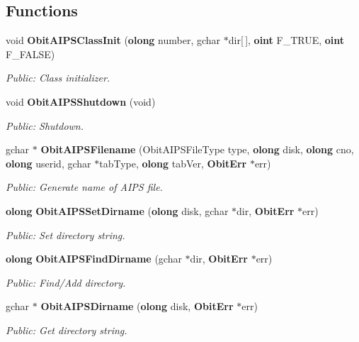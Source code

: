 \subsection*{Functions}
\begin{CompactItemize}
\item 
void {\bf Obit\-AIPSClass\-Init} ({\bf olong} number, gchar $\ast$dir[$\,$], {\bf oint} F\_\-TRUE, {\bf oint} F\_\-FALSE)
\begin{CompactList}\small\item\em Public: Class initializer. \item\end{CompactList}\item 
void {\bf Obit\-AIPSShutdown} (void)
\begin{CompactList}\small\item\em Public: Shutdown. \item\end{CompactList}\item 
gchar $\ast$ {\bf Obit\-AIPSFilename} (Obit\-AIPSFile\-Type type, {\bf olong} disk, {\bf olong} cno, {\bf olong} userid, gchar $\ast$tab\-Type, {\bf olong} tab\-Ver, {\bf Obit\-Err} $\ast$err)
\begin{CompactList}\small\item\em Public: Generate name of AIPS file. \item\end{CompactList}\item 
{\bf olong} {\bf Obit\-AIPSSet\-Dirname} ({\bf olong} disk, gchar $\ast$dir, {\bf Obit\-Err} $\ast$err)
\begin{CompactList}\small\item\em Public: Set directory string. \item\end{CompactList}\item 
{\bf olong} {\bf Obit\-AIPSFind\-Dirname} (gchar $\ast$dir, {\bf Obit\-Err} $\ast$err)
\begin{CompactList}\small\item\em Public: Find/Add directory. \item\end{CompactList}\item 
gchar $\ast$ {\bf Obit\-AIPSDirname} ({\bf olong} disk, {\bf Obit\-Err} $\ast$err)
\begin{CompactList}\small\item\em Public: Get directory string. \item\end{CompactList}\item 

\end{CompactItemize}
